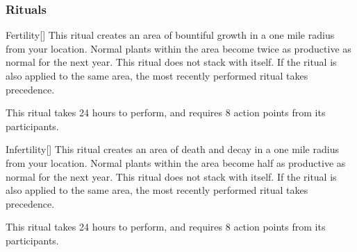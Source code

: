 \subsubsection{Rituals}


\lowercase{\hypertarget{spell:Fertility}{}}\label{spell:Fertility}
\begin{apability}[\nth{2}]{\hypertarget{spell:Fertility}{Fertility}}[]
\targetrule
This ritual creates an area of bountiful growth in a one mile radius  from your location.
Normal plants within the area become twice as productive as normal for the next year.
This ritual does not stack with itself.
If the  ritual is also applied to the same area, the most recently performed ritual takes precedence.

This ritual takes 24 hours to perform, and requires 8 action points from its participants.
\end{apability}
\vspace{0.25em}



\lowercase{\hypertarget{spell:Infertility}{}}\label{spell:Infertility}
\begin{apability}[\nth{2}]{\hypertarget{spell:Infertility}{Infertility}}[]
\targetrule
This ritual creates an area of death and decay in a one mile radius  from your location.
Normal plants within the area become half as productive as normal for the next year.
This ritual does not stack with itself.
If the  ritual is also applied to the same area, the most recently performed ritual takes precedence.

This ritual takes 24 hours to perform, and requires 8 action points from its participants.
\end{apability}
\vspace{0.25em}




